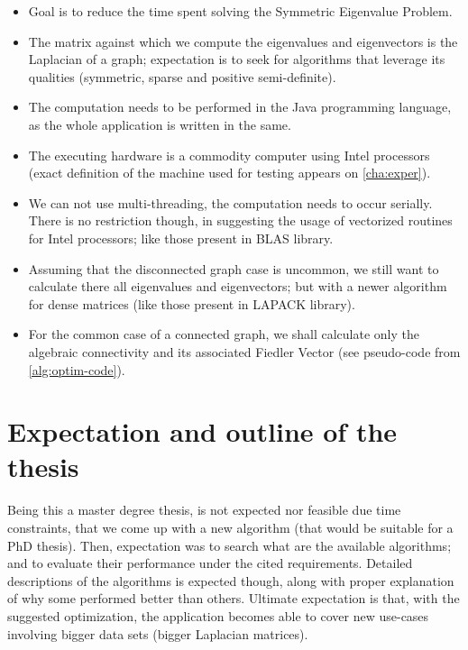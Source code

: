 \begin{itemize}
  \item Goal is to reduce the time spent solving the Symmetric Eigenvalue
    Problem. \\
  \item The matrix against which we compute the eigenvalues and
    eigenvectors is the Laplacian of a graph; expectation is to seek
    for algorithms that leverage its qualities (symmetric, sparse and
    positive semi-definite). \\
  \item The computation needs to be performed in the Java programming
    language, as the whole application is written in the same. \\
  \item The executing hardware is a commodity computer using Intel
    processors (exact definition of the machine used for testing
    appears on \cref{cha:exper}).
  \item We can not use multi-threading, the computation needs to occur
    serially. There is no restriction
    though, in suggesting the usage of vectorized routines for Intel
    processors; like those present in BLAS library. \\
  \item Assuming that the disconnected graph case is uncommon, we
    still want to calculate there all eigenvalues and eigenvectors;
    but with a newer algorithm for dense matrices (like those present
    in LAPACK library). \\
  \item For the common case of a connected graph, we shall calculate
    only the algebraic connectivity and its associated Fiedler
    Vector (see pseudo-code from  \cref{alg:optim-code}).
\end{itemize}
\hfill

\section{Expectation and outline of the thesis}
Being this a master degree thesis, is not expected nor feasible due
time constraints, that we come up with a new algorithm (that would be
suitable for a PhD thesis). Then, expectation was to search what are
the available algorithms; and to evaluate their performance under the
cited requirements. Detailed descriptions of the algorithms is
expected though, along with proper explanation of why some performed
better than others. Ultimate expectation is that, with the suggested
optimization, the application becomes able to cover new use-cases
involving bigger data sets (bigger Laplacian matrices). \\

